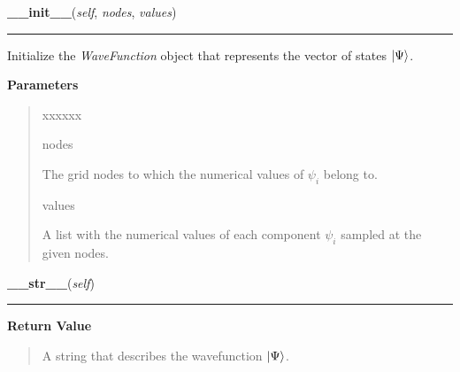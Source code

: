 \hspace{.8\funcindent}\begin{boxedminipage}{\funcwidth}

    \raggedright \textbf{\_\_init\_\_}(\textit{self}, \textit{nodes}, \textit{values})

    \vspace{-1.5ex}

    \rule{\textwidth}{0.5\fboxrule}
\setlength{\parskip}{2ex}
    Initialize the \textit{WaveFunction} object that represents the vector
    of states $\Ket{\Psi}$.

\setlength{\parskip}{1ex}
      \textbf{Parameters}
      \vspace{-1ex}

      \begin{quote}
        \begin{Ventry}{xxxxxx}

          \item[nodes]

          The grid nodes to which the numerical values of
          $\psi_i$ belong to.

          \item[values]

          A list with the numerical values of each component
          $\psi_i$ sampled at the given nodes.

        \end{Ventry}

      \end{quote}

    \end{boxedminipage}

    \label{WaveFunction:WaveFunction:__str__}

    \vspace{0.5ex}

\hspace{.8\funcindent}\begin{boxedminipage}{\funcwidth}

    \raggedright \textbf{\_\_str\_\_}(\textit{self})

    \vspace{-1.5ex}

    \rule{\textwidth}{0.5\fboxrule}
\setlength{\parskip}{2ex}
\setlength{\parskip}{1ex}
      \textbf{Return Value}
    \vspace{-1ex}

      \begin{quote}
      A string that describes the wavefunction
      $\Ket{\Psi}$.

      \end{quote}

    \end{boxedminipage}

